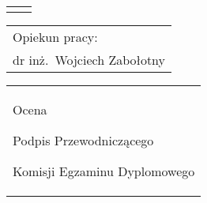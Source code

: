\begin{titlepage}
{\begin{center}
        \vspace*{7\baselineskip}
        \hfill\mbox{}\par\vspace*{\baselineskip}\noindent
        \begin{tabular}[b]{@{}p{3cm}@{\ }l@{}}
            {\large\hfill } & {\large }
        \end{tabular}
        \hfill
        \begin{tabular}[b]{@{}l@{}}
        Opiekun pracy: \\[\smallskipamount]
        {\large dr inż.\ Wojciech Zabołotny}
        \end{tabular}\par
        \vspace*{4\baselineskip}
    \begin{tabular}{p{\textwidth}}
    \begin{flushleft}
        \begin{minipage}{7cm}
        Ocena \dotfill
        \par\vspace{1.6\baselineskip}
        \dotfill
        \par\noindent
        \centerline{\footnotesize Podpis Przewodniczącego} \par
        \centerline{\footnotesize Komisji Egzaminu Dyplomowego}\par
        \end{minipage}
    \end{flushleft}
    \end{tabular}
    \end{center}}


\end{titlepage}
